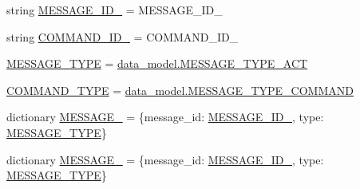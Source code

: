\begin{DoxyCompactItemize}
\item 
string \hyperlink{namespaceparlai_1_1mturk_1_1core_1_1dev_1_1test_1_1test__mturk__agent_acb7fc68e8891cd08db8e82570058b6b8}{M\+E\+S\+S\+A\+G\+E\+\_\+\+I\+D\+\_} = \textquotesingle{}M\+E\+S\+S\+A\+G\+E\+\_\+\+I\+D\+\_\textquotesingle{}
\item 
string \hyperlink{namespaceparlai_1_1mturk_1_1core_1_1dev_1_1test_1_1test__mturk__agent_afc8f97a07751ffff2f19873ff90b8f4c}{C\+O\+M\+M\+A\+N\+D\+\_\+\+I\+D\+\_} = \textquotesingle{}C\+O\+M\+M\+A\+N\+D\+\_\+\+I\+D\+\_\textquotesingle{}
\item 
\hyperlink{namespaceparlai_1_1mturk_1_1core_1_1dev_1_1test_1_1test__mturk__agent_aa9bf27db8f1e0fc8de419844f75156b4}{M\+E\+S\+S\+A\+G\+E\+\_\+\+T\+Y\+PE} = \hyperlink{namespaceparlai_1_1mturk_1_1core_1_1dev_1_1data__model_a54f29cc8a3c119ca6c74b83bc857376b}{data\+\_\+model.\+M\+E\+S\+S\+A\+G\+E\+\_\+\+T\+Y\+P\+E\+\_\+\+A\+CT}
\item 
\hyperlink{namespaceparlai_1_1mturk_1_1core_1_1dev_1_1test_1_1test__mturk__agent_a7e6fc885aa8009129bfb1fd046489ac3}{C\+O\+M\+M\+A\+N\+D\+\_\+\+T\+Y\+PE} = \hyperlink{namespaceparlai_1_1mturk_1_1core_1_1dev_1_1data__model_a04fb911d8dd6ce670b9dcadb28559eef}{data\+\_\+model.\+M\+E\+S\+S\+A\+G\+E\+\_\+\+T\+Y\+P\+E\+\_\+\+C\+O\+M\+M\+A\+ND}
\item 
dictionary \hyperlink{namespaceparlai_1_1mturk_1_1core_1_1dev_1_1test_1_1test__mturk__agent_a0e4609e1b0ca9508cd314703dfce482a}{M\+E\+S\+S\+A\+G\+E\+\_} = \{\textquotesingle{}message\+\_\+id\textquotesingle{}\+: \hyperlink{namespaceparlai_1_1mturk_1_1core_1_1dev_1_1test_1_1test__mturk__agent_aa598175bdf1b721b51abe749f7459faf}{M\+E\+S\+S\+A\+G\+E\+\_\+\+I\+D\+\_}, \textquotesingle{}type\textquotesingle{}\+: \hyperlink{namespaceparlai_1_1mturk_1_1core_1_1dev_1_1test_1_1test__mturk__agent_aa9bf27db8f1e0fc8de419844f75156b4}{M\+E\+S\+S\+A\+G\+E\+\_\+\+T\+Y\+PE}\}
\item 
dictionary \hyperlink{namespaceparlai_1_1mturk_1_1core_1_1dev_1_1test_1_1test__mturk__agent_ac0abcfffe9b45c9f7c2a108e891a43e8}{M\+E\+S\+S\+A\+G\+E\+\_} = \{\textquotesingle{}message\+\_\+id\textquotesingle{}\+: \hyperlink{namespaceparlai_1_1mturk_1_1core_1_1dev_1_1test_1_1test__mturk__agent_acb7fc68e8891cd08db8e82570058b6b8}{M\+E\+S\+S\+A\+G\+E\+\_\+\+I\+D\+\_}, \textquotesingle{}type\textquotesingle{}\+: \hyperlink{namespaceparlai_1_1mturk_1_1core_1_1dev_1_1test_1_1test__mturk__agent_aa9bf27db8f1e0fc8de419844f75156b4}{M\+E\+S\+S\+A\+G\+E\+\_\+\+T\+Y\+PE}\}
\item 

\end{DoxyCompactItemize}
